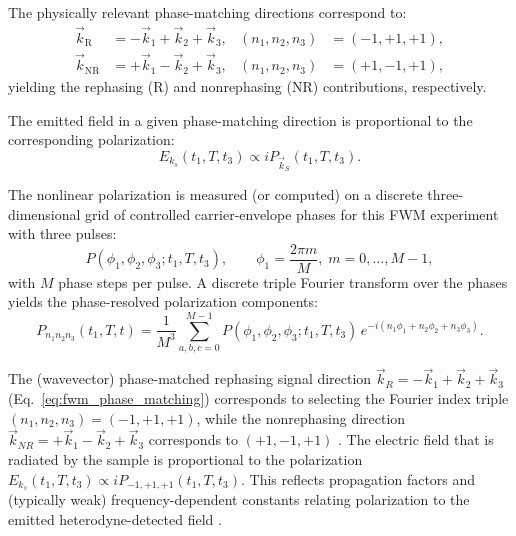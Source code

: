 \noindent The physically relevant phase-matching directions correspond to:
\begin{align}
	\vec{k}_{\mathrm{R}}  & = -\vec{k}_1 + \vec{k}_2 + \vec{k}_3,
	                      & (n_1,n_2,n_3)                         & = (-1,+1,+1), \label{eq:rephasing_selection}    \\
	\vec{k}_{\mathrm{NR}} & = +\vec{k}_1 - \vec{k}_2 + \vec{k}_3,
	                      & (n_1,n_2,n_3)                         & = (+1,-1,+1), \label{eq:nonrephasing_selection}
\end{align}
yielding the rephasing (R) and nonrephasing (NR) contributions, respectively.

\noindent The emitted field in a given phase-matching direction is proportional to the corresponding polarization:
\begin{equation}
	E_{k_s}(t_1,T,t_3) \propto i P_{\vec{k}_S}(t_1,T,t_3).
	\label{eq:field_polarization_relation}
\end{equation}

\noindent The nonlinear polarization is measured (or computed) on a discrete three-dimensional grid of controlled carrier-envelope phases for this FWM experiment with three pulses:
\begin{equation}
	P(\phi_{1}, \phi_{2}, \phi_{3}; t_1, T, t_3), \qquad
	\phi_{1} = \frac{2\pi m}{M}, \; m=0,\dots,M-1,
	\label{eq:phase_grid_definition}
\end{equation}
with $M$ phase steps per pulse. A discrete triple Fourier transform over the phases yields the phase-resolved polarization components:
\begin{equation}
	P_{n_1 n_2 n_3}(t_1, T, t)
	=
	\frac{1}{M^{3}}
	\sum_{a,b,c=0}^{M-1}
	P(\phi_{1}, \phi_{2}, \phi_{3}; t_1, T, t_3)\,
	e^{-i ( n_1 \phi_{1} + n_2 \phi_{2} + n_3 \phi_{3} )}.
	\label{eq:dft_phase_cycling}
\end{equation}

\noindent The (wavevector) phase-matched rephasing signal direction $\vec{k}_R = -\vec{k}_1 + \vec{k}_2 + \vec{k}_3$ (Eq.~\eqref{eq:fwm_phase_matching}) corresponds to selecting the Fourier index triple $(n_1,n_2,n_3)=(-1,+1,+1)$, while the nonrephasing direction $\vec{k}_{NR} = +\vec{k}_1 - \vec{k}_2 + \vec{k}_3$ corresponds to $(+1,-1,+1)$ \cite{mukamel1995principlesnonlinearoptical, cho2009twodimensionalopticalspectroscopy, greenetal2024vibrationalcoherenceshalfbroadband}. The electric field that is radiated by the sample is proportional to the polarization $ E_{k_s}(t_1, T, t_3) \propto i P_{-1,+1,+1}(t_1, T, t_3) $. This reflects propagation factors and (typically weak) frequency-dependent constants relating polarization to the emitted heterodyne-detected field \cite{mukamel1995principlesnonlinearoptical, greenetal2024vibrationalcoherenceshalfbroadband}.

